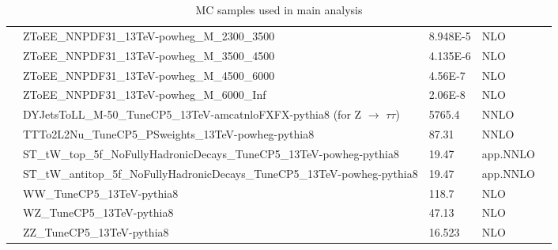 \begin{table}[htp]
\begin{center}
{\begin{tabular}{|c|l|l|l|l|}
&ZToEE\_NNPDF31\_13TeV-powheg\_M\_2300\_3500              & 8.948E-5      & NLO                 \\
&ZToEE\_NNPDF31\_13TeV-powheg\_M\_3500\_4500              & 4.135E-6      & NLO                 \\
&ZToEE\_NNPDF31\_13TeV-powheg\_M\_4500\_6000             & 4.56E-7      & NLO                \\
&ZToEE\_NNPDF31\_13TeV-powheg\_M\_6000\_Inf              & 2.06E-8      & NLO                 \\
&DYJetsToLL\_M-50\_TuneCP5\_13TeV-amcatnloFXFX-pythia8 (for Z $\rightarrow$ $\tau\tau$) & 5765.4       & NNLO             \\\cline{2-4}
&TTTo2L2Nu\_TuneCP5\_PSweights\_13TeV-powheg-pythia8        & 87.31        & NNLO                      \\
&ST\_tW\_top\_5f\_NoFullyHadronicDecays\_TuneCP5\_13TeV-powheg-pythia8         & 19.47         & app.NNLO           \\
&ST\_tW\_antitop\_5f\_NoFullyHadronicDecays\_TuneCP5\_13TeV-powheg-pythia8     & 19.47         & app.NNLO           \\\cline{2-4}
&WW\_TuneCP5\_13TeV-pythia8                                         & 118.7        & NLO                      \\
&WZ\_TuneCP5\_13TeV-pythia8                                         & 47.13        & NLO                      \\
&ZZ\_TuneCP5\_13TeV-pythia8                                         & 16.523       & NLO                      \\\hline
\end{tabular}}
\caption{MC samples used in main analysis}
\label{tab:Z_mc-samples_1}
  \end{center}
\end{table}



